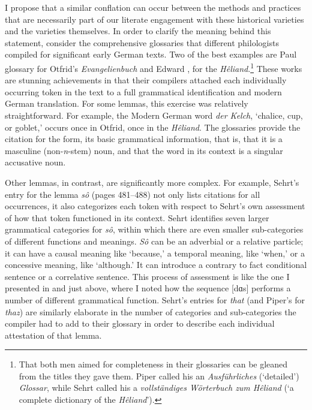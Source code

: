 I propose that a similar conflation can occur between the methods and practices that are necessarily part of our literate engagement with these historical varieties and the varieties themselves. In order to clarify the meaning behind this statement, consider the comprehensive glossaries that different philologists compiled for significant early German texts. Two of the best examples are Paul  glossary for Otfrid’s \textit{Evangelienbuch} and Edward , for the \textit{Hêliand}.\footnote{{That both men aimed for completeness in their glossaries can be gleaned from the titles they gave them. Piper called his an }\textrm{\textit{Ausführliches}}\textrm{ (`detailed')} \textrm{\textit{Glossar}}\textrm{, while Sehrt called his a }\textrm{\textit{vollständiges Wörterbuch zum Hêliand}}\textrm{ (`a complete dictionary of the} \textrm{\textit{Hêliand}}\textrm{').}} These works are stunning achievements in that their compilers attached each individually occurring token in the text to a full grammatical identification and modern German translation. For some lemmas, this exercise was relatively straightforward. For example, the Modern German word \textit{der Kelch}, ‘chalice, cup, or goblet,’ occurs once in Otfrid, once in the \textit{Hêliand}. The glossaries provide the citation for the form, its basic grammatical information, that is, that it is a masculine (non-\textit{n}{}-stem) noun, and that the word in its context is a singular accusative noun.

\begin{sloppypar}
Other lemmas, in contrast, are significantly more complex. For example, Sehrt’s entry for the lemma \textit{sô} (pages 481--488) not only lists citations for all occurrences, it also categorizes each token with respect to Sehrt’s own assessment of how that token functioned in its context. Sehrt identifies seven larger grammatical categories for \textit{sô}, within which there are even smaller sub-categories of different functions and meanings. \textit{Sô} can be an adverbial or a relative particle; it can have a causal meaning like ‘because,’ a temporal meaning, like ‘when,’ or a concessive meaning, like ‘although.’ It can introduce a contrary to fact conditional sentence or a correlative sentence. This process of assessment is like the one I presented in  and  just above, where I noted how the sequence [dɑs] performs a number of different grammatical function. Sehrt’s entries for \textit{that} (and Piper’s for \textit{thaz}) are similarly elaborate in the number of categories and sub-categories the compiler had to add to their glossary in order to describe each individual attestation of that lemma.
\end{sloppypar}

